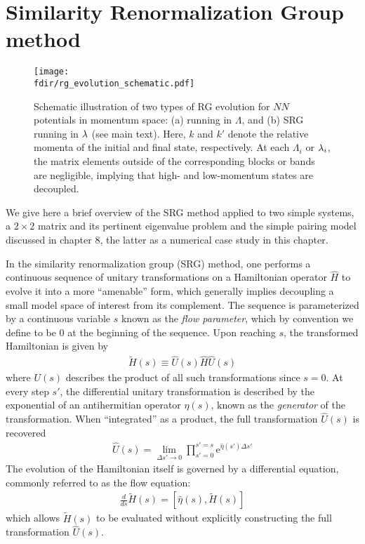 \section{Similarity Renormalization Group method}

\begin{figure*}[t]
  \begin{center}
    \texttt{[image: \\fdir/rg\_evolution\_schematic.pdf]}
  \end{center}
  \caption{\label{fig:schematic}Schematic illustration of two types of RG evolution 
    for $NN$ potentials in momentum space: (a) \Vlowk{} running in $\Lambda$, and 
    (b) SRG running in $\lambda$ (see main text). Here, $k$ and $k'$ denote the 
    relative momenta of the initial and final state, respectively. At each $\Lambda_i$ 
    or $\lambda_i$, the matrix elements outside of the corresponding 
    blocks or bands are negligible, implying that high- and low-momentum 
    states are decoupled.
  }
\end{figure*}

We give here a brief overview of the SRG method applied to two simple systems,  a $2\times 2$ matrix and its pertinent eigenvalue problem and the simple pairing model discussed in chapter 8, the latter as a numerical case study in this chapter. 

In the similarity renormalization group (SRG) method, one performs a
continuous sequence of unitary transformations on a Hamiltonian
operator $\hat H$ to evolve it into a more ``amenable'' form, which
generally implies decoupling a small model space of interest from its
complement.  The sequence is parameterized by a continuous variable
$s$ known as the \textit{flow parameter}, which by convention we
define to be $0$ at the beginning of the sequence.  Upon reaching $s$,
the transformed Hamiltonian is given by
\begin{align*}
  \tilde H(s) \equiv \hat U(s) \hat H \hat U(s)
\end{align*}
where $U(s)$ describes the product of all such transformations since $s = 0$.
At every step $s'$, the differential unitary transformation is described by
the exponential of an antihermitian operator $\eta(s)$, known as the
\textit{generator} of the transformation.  When ``integrated'' as a product,
the full transformation $\hat U(s)$ is recovered
\begin{align*}
  \hat U(s) = \lim_{\Delta s' \to 0} \prod_{s' = 0}^{s' = s}
  \mathrm e^{\hat \eta(s') \Delta s'}
\end{align*}
The evolution of the Hamiltonian itself is governed by a differential
equation, commonly referred to as the flow equation:
\begin{gather} \label{eq:imsrgode}
  \frac{d}{d s} \tilde H(s) = [\hat \eta(s), \tilde H(s)]
\end{gather}
which allows $\tilde H(s)$ to be evaluated without explicitly constructing the
full transformation $\hat U(s)$.

